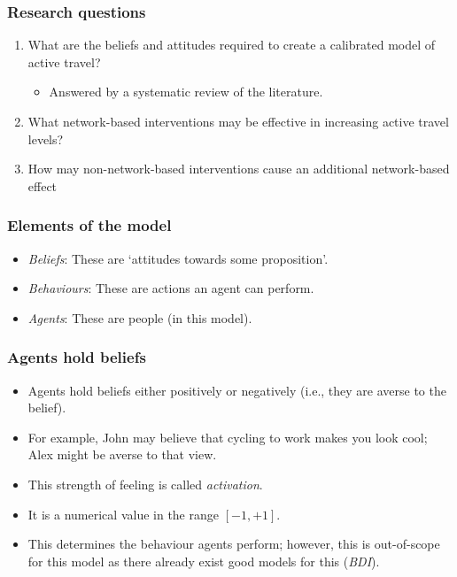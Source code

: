 \documentclass[aspectratio=169]{beamer}
\begin{document}
\begin{frame}
    \frametitle{Research questions}
    \begin{enumerate}
        \item What are the beliefs and attitudes required to create a calibrated model of active travel?
              \begin{itemize}
                  \item Answered by a systematic review of the literature.
              \end{itemize}
        \item What network-based interventions may be effective in increasing active travel levels?
        \item How may non-network-based interventions cause an additional network-based effect
    \end{enumerate}
\end{frame}

\begin{frame}
    \frametitle{Elements of the model}
    \begin{itemize}
        \item \emph{Beliefs}: These are `attitudes towards some proposition'.
        \item \emph{Behaviours}: These are actions an agent can perform.
        \item \emph{Agents}: These are people (in this model).
    \end{itemize}
\end{frame}

\begin{frame}
    \frametitle{Agents hold beliefs}
    \begin{itemize}
        \item Agents hold beliefs either positively or negatively (i.e., they are averse to the belief).
        \item For example, John may believe that cycling to work makes you look cool; Alex might be averse to that view.
        \item This strength of feeling is called \emph{activation}.
        \item It is a numerical value in the range \([-1,+1]\).
        \item This determines the behaviour agents perform; however, this is out-of-scope for this model as there already exist good models for this (\emph{BDI}).
    \end{itemize}
\end{frame}
\end{document}
